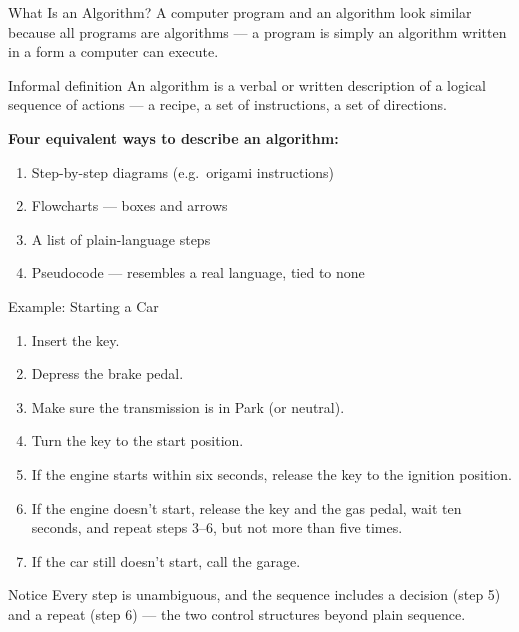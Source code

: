 \documentclass[9pt,aspectratio=169,xcolor=table]{beamer}
\begin{document}
\begin{frame}{What Is an Algorithm?}
    \leavevmode
    A computer program and an algorithm look similar because
    \alert{all programs are algorithms} --- a program is simply an
    algorithm written in a form a computer can execute.

    \vspace{2mm}
    \begin{block}{Informal definition}
        An algorithm is a verbal or written description of a logical
        sequence of actions --- a recipe, a set of instructions, a set
        of directions.
    \end{block}

    \vspace{2mm}
    \textbf{Four equivalent ways to describe an algorithm:}
    \begin{enumerate}\itemsep1pt
        \item Step-by-step diagrams (e.g.\ origami instructions)
        \item \alert{Flowcharts} --- boxes and arrows
        \item A list of plain-language steps
        \item \alert{Pseudocode} --- resembles a real language, tied to none
    \end{enumerate}
\end{frame}

\begin{frame}{Example: Starting a Car}
    \leavevmode
    \small
    \begin{enumerate}\itemsep2pt
        \item Insert the key.
        \item Depress the brake pedal.
        \item Make sure the transmission is in Park (or neutral).
        \item Turn the key to the start position.
        \item If the engine starts within six seconds, release the key to
              the ignition position.
        \item If the engine doesn't start, release the key and the gas
              pedal, wait ten seconds, and repeat steps 3--6, but not
              more than five times.
        \item If the car still doesn't start, call the garage.
    \end{enumerate}

    \vspace{2mm}
    \begin{block}{Notice}
        Every step is unambiguous, and the sequence includes a
        \alert{decision} (step 5) and a \alert{repeat} (step 6) --- the
        two control structures beyond plain sequence.
    \end{block}
\end{frame}
\end{document}
